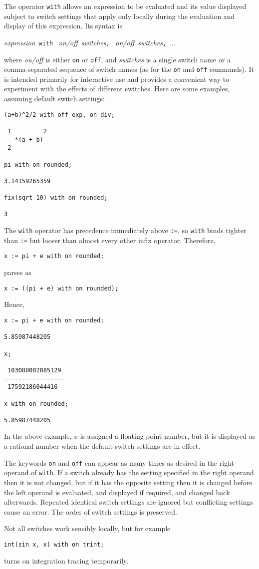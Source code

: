 
The operator \texttt{with} allows an expression to be evaluated and
its value displayed subject to switch settings that apply only locally
during the evaluation and display of this expression.  Its syntax is
\begin{center}
  \textit{expression}~\texttt{with}~%
  \textit{on/off}~\textit{switches}\texttt{,}~%
  \textit{on/off}~\textit{switches}\texttt{,}~...
\end{center}
where \textit{on/off} is either \texttt{on} or \texttt{off}, and
\textit{switches} is a single switch name or a comma-separated
sequence of switch names (as for the \texttt{on} and \texttt{off}
commands).  It is intended primarily for interactive use and provides
a convenient way to experiment with the effects of different switches.
Here are some examples, assuming default switch settings:
\begin{verbatim}
(a+b)^2/2 with off exp, on div;

 1         2
---*(a + b)
 2

pi with on rounded;

3.14159265359

fix(sqrt 10) with on rounded;

3
\end{verbatim}

The \texttt{with} operator has precedence immediately above
\texttt{:=}, so \texttt{with} binds tighter than \texttt{:=} but looser
than almost every other infix operator.  Therefore,
\begin{verbatim}
x := pi + e with on rounded;
\end{verbatim}
parses as
\begin{verbatim}
x := ((pi + e) with on rounded);
\end{verbatim}
Hence,
\begin{verbatim}
x := pi + e with on rounded;

5.85987448205

x;

 103088002085129
-----------------
 17592186044416

x with on rounded;

5.85987448205
\end{verbatim}
In the above example, $x$ is assigned a floating-point number, but it
is displayed as a rational number when the default switch settings are
in effect.

The keywords \texttt{on} and \texttt{off} can appear as many times as
desired in the right operand of \texttt{with}.  If a switch already
has the setting specified in the right operand then it is not changed,
but if it has the opposite setting then it is changed before the left
operand is evaluated, and displayed if required, and changed back
afterwards.  Repeated identical switch settings are ignored but
conflicting settings cause an error.  The order of switch settings is
preserved.

Not all switches work sensibly locally, but for example
\begin{verbatim}
int(sin x, x) with on trint;
\end{verbatim}
turns on integration tracing temporarily.
